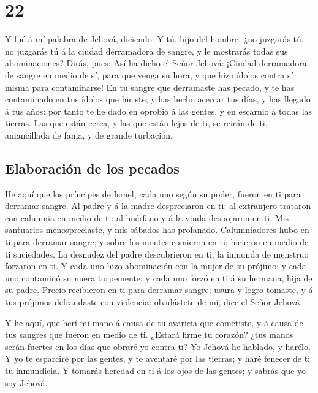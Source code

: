 \hypertarget{section-21}{%
\section{22}\label{section-21}}

 Y fué á mí palabra de Jehová, diciendo:  Y
tú, hijo del hombre, ¿no juzgarás tú, no juzgarás tú á la ciudad
derramadora de sangre, y le mostrarás todas sus abominaciones?
 Dirás, pues: Así ha dicho el Señor Jehová: ¡Ciudad
derramadora de sangre en medio de sí, para que venga su hora, y que hizo
ídolos contra sí misma para contaminarse!  En tu sangre
que derramaste has pecado, y te has contaminado en tus ídolos que
hiciste; y has hecho acercar tus días, y has llegado á tus años: por
tanto te he dado en oprobio á las gentes, y en escarnio á todas las
tierras.  Las que están cerca, y las que están lejos de
ti, se reirán de ti, amancillada de fama, y de grande turbación.

\hypertarget{elaboraciuxf3n-de-los-pecados}{%
\subsection{Elaboración de los
pecados}\label{elaboraciuxf3n-de-los-pecados}}

 He aquí que los príncipes de Israel, cada uno según su
poder, fueron en ti para derramar sangre.  Al padre y á la
madre despreciaron en ti: al extranjero trataron con calumnia en medio
de ti: al huérfano y á la viuda despojaron en ti.  Mis
santuarios menospreciaste, y mis sábados has profanado. 
Calumniadores hubo en ti para derramar sangre; y sobre los montes
comieron en ti: hicieron en medio de ti suciedades.  La
desnudez del padre descubrieron en ti; la inmunda de menstruo forzaron
en ti.  Y cada uno hizo abominación con la mujer de su
prójimo; y cada uno contaminó su nuera torpemente; y cada uno forzó en
ti á su hermana, hija de su padre.  Precio recibieron en
ti para derramar sangre; usura y logro tomaste, y á tus prójimos
defraudaste con violencia: olvidástete de mí, dice el Señor Jehová.

 Y he aquí, que herí mi mano á causa de tu avaricia que
cometiste, y á causa de tus sangres que fueron en medio de ti.
 ¿Estará firme tu corazón? ¿tus manos serán fuertes en
los días que obraré yo contra ti? Yo Jehová he hablado, y harélo.
 Y yo te esparciré por las gentes, y te aventaré por las
tierras; y haré fenecer de ti tu inmundicia.  Y tomarás
heredad en ti á los ojos de las gentes; y sabrás que yo soy Jehová.

